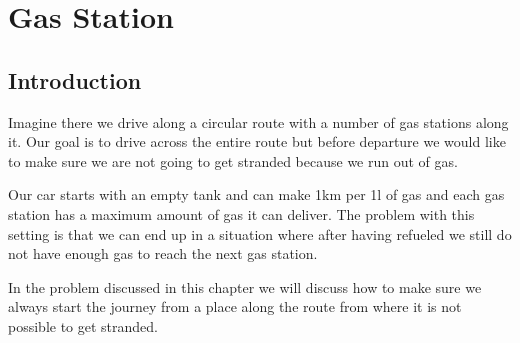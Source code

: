 %



\chapter{Gas Station \faGasPump}
\label{ch:gas_station}
\section*{Introduction}
Imagine there we drive along a circular route with a number of gas stations along it. Our goal is to drive across the entire route but before departure we would like to make sure we are not going to get stranded because we run out of gas.

Our car starts with an empty tank and can make 1km per 1l of gas and each gas station has a maximum amount of gas it can deliver. 
The problem with this setting is that we can end up in a situation where after 
having refueled we still do not have enough gas to reach the next gas station. 

In the problem discussed in this chapter we will discuss how to make sure  we always start the journey from a place along the route from where it is not possible to get stranded.


